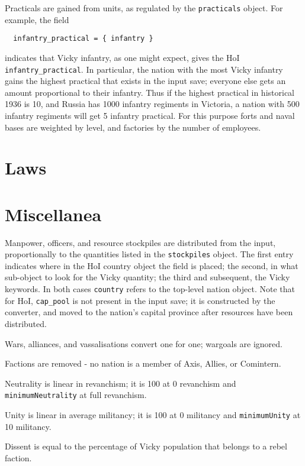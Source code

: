 \documentclass[12pt,ebook,oneside]{book}
\begin{document}
Practicals are gained from units, as regulated by the
\texttt{practicals} object. For example, the field
\begin{verbatim}
  infantry_practical = { infantry }
\end{verbatim}
indicates that Vicky infantry, as one might expect, gives the HoI
\texttt{infantry\_practical}. In particular, the nation with the most
Vicky infantry gains the highest practical that exists in the input
save; everyone else gets an amount proportional to their
infantry. Thus if the highest practical in historical 1936 is 10, and
Russia has 1000 infantry regiments in Victoria, a nation with 500
infantry regiments will get 5 infantry practical. For this purpose
forts and naval bases are weighted by level, and factories by the
number of employees. 

\section{Laws}

\section{Miscellanea}

Manpower, officers, and resource stockpiles are distributed 
from the input, proportionally to the quantities listed in the
\texttt{stockpiles} object. The first entry indicates where in the HoI
country object the field is placed; the second, in what sub-object to
look for the Vicky quantity; the third and subsequent, the Vicky keywords. In both
cases \texttt{country} refers to the top-level nation
object. Note that for HoI, \texttt{cap\_pool} is not present in the
input save; it is constructed by the converter, and moved to the
nation's capital province after resources have been distributed. 

Wars, alliances, and vassalisations convert one for one; wargoals are
ignored. 

Factions are removed - no nation is a member of Axis, Allies, or
Comintern. 

Neutrality is linear in revanchism; it is 100 at 0 revanchism and
\texttt{minimumNeutrality} at full revanchism. 

Unity is linear in average militancy; it is 100 at 0 militancy and
\texttt{minimumUnity} at 10 militancy. 

Dissent is equal to the percentage of Vicky population that belongs to a
rebel faction. 
\end{document}
